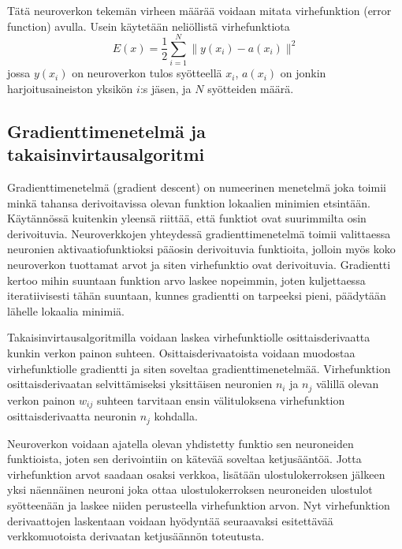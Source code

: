 \documentclass[finnish]{tktltiki2}
\theoremstyle{definition}
\theoremstyle{remark}
\begin{document}
  Tätä neuroverkon tekemän virheen määrää voidaan mitata virhefunktion (error function) avulla. Usein käytetään neliöllistä virhefunktiota
  \begin{equation}
    E(x) = \frac{1}{2} \sum_{i=1}^{N} \| y(x_i)-a(x_i) \|^2
    \label{eq:error-function}
  \end{equation}
  jossa $y(x_i)$ on neuroverkon tulos syötteellä $x_i$, $a(x_i)$ on jonkin harjoitusaineiston yksikön $i$:s jäsen, ja $N$ syötteiden määrä.




  \subsection{Gradienttimenetelmä ja takaisinvirtausalgoritmi}
  Gradienttimenetelmä (gradient descent) on numeerinen menetelmä joka toimii minkä tahansa derivoitavissa olevan funktion lokaalien minimien etsintään. Käytännössä kuitenkin yleensä riittää, että funktiot ovat suurimmilta osin derivoituvia. Neuroverkkojen yhteydessä gradienttimenetelmä toimii valittaessa neuronien aktivaatiofunktioksi pääosin derivoituvia funktioita, jolloin myös koko neuroverkon tuottamat arvot ja siten virhefunktio ovat derivoituvia. Gradientti kertoo mihin suuntaan funktion arvo laskee nopeimmin, joten kuljettaessa iteratiivisesti tähän suuntaan, kunnes gradientti on tarpeeksi pieni, päädytään lähelle lokaalia minimiä.

  Takaisinvirtausalgoritmilla voidaan laskea virhefunktiolle osittaisderivaatta kunkin verkon painon suhteen. Osittaisderivaatoista voidaan muodostaa virhefunktiolle gradientti ja siten soveltaa gradienttimenetelmää. Virhefunktion osittaisderivaatan selvittämiseksi yksittäisen neuronien $n_i$ ja $n_j$ välillä olevan verkon painon $w_{ij}$ suhteen tarvitaan ensin välituloksena virhefunktion osittaisderivaatta neuronin $n_j$ kohdalla. 

  Neuroverkon voidaan ajatella olevan yhdistetty funktio sen neuroneiden funktioista, joten sen derivointiin on kätevää soveltaa ketjusääntöä. Jotta virhefunktion arvot saadaan osaksi verkkoa, lisätään ulostulokerroksen jälkeen yksi näennäinen neuroni joka ottaa ulostulokerroksen neuroneiden ulostulot syötteenään ja laskee niiden perusteella virhefunktion arvon. Nyt virhefunktion derivaattojen laskentaan voidaan hyödyntää seuraavaksi esitettävää verkkomuotoista derivaatan ketjusäännön toteutusta. 
    
\end{document}
